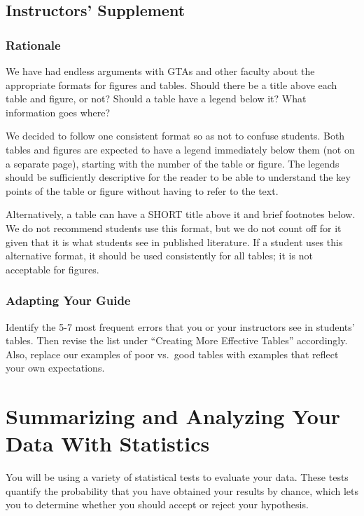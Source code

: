 \documentclass[
]{book}
\begin{document}
\hypertarget{instructors-supplement-4}{%
\section{Instructors' Supplement}\label{instructors-supplement-4}}

\hypertarget{rationale-1}{%
\subsection{Rationale}\label{rationale-1}}

We have had endless arguments with GTAs and other faculty about the appropriate formats for figures and tables. Should there be a title above each table and figure, or not? Should a table have a legend below it? What information goes where?

We decided to follow one consistent format so as not to confuse students. Both tables and figures are expected to have a legend immediately below them (not on a separate page), starting with the number of the table or figure. The legends should be sufficiently descriptive for the reader to be able to understand the key points of the table or figure without having to refer to the text.

Alternatively, a table can have a SHORT title above it and brief footnotes below. We do not recommend students use this format, but we do not count off for it given that it is what students see in published literature. If a student uses this alternative format, it should be used consistently for all tables; it is not acceptable for figures.

\hypertarget{adapting-your-guide-3}{%
\subsection{Adapting Your Guide}\label{adapting-your-guide-3}}

Identify the 5-7 most frequent errors that you or your instructors see in students' tables. Then revise the list under ``Creating More Effective Tables'' accordingly. Also, replace our examples of poor vs.~good tables with examples that reflect your own expectations.

\hypertarget{biostats450}{%
\chapter{Summarizing and Analyzing Your Data With Statistics}\label{biostats450}}

You will be using a variety of statistical tests to evaluate your data. These tests quantify the probability that you have obtained your results by chance, which lets you to determine whether you should accept or reject your hypothesis.
\end{document}
